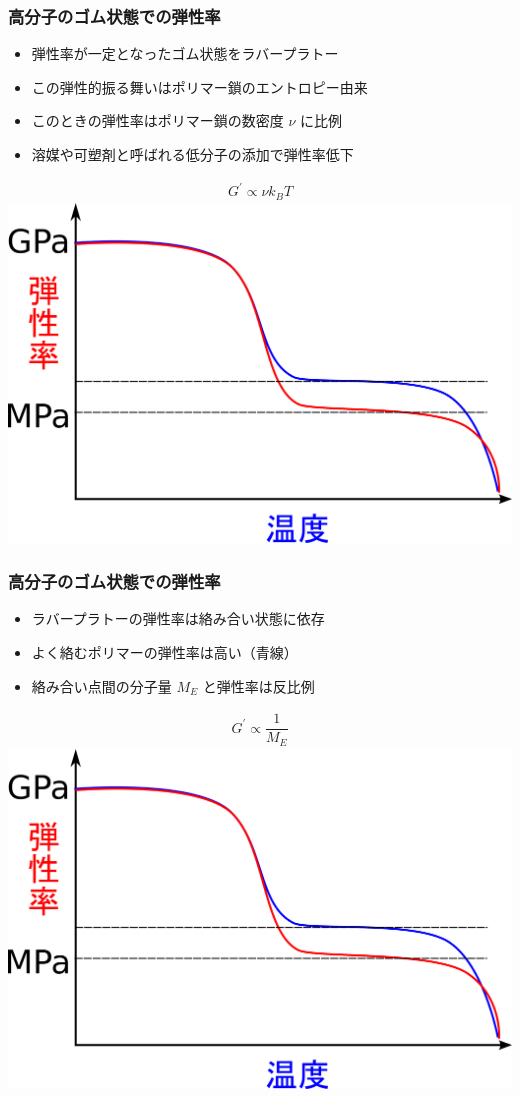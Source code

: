 \documentclass[12pt, dvipdfmx]{beamer}
\begin{document}
\begin{frame}
	\frametitle{高分子のゴム状態での弾性率}
				\begin{itemize}
					\item 弾性率が一定となったゴム状態をラバープラトー
					\item この弾性的振る舞いはポリマー鎖のエントロピー由来
					\item このときの弾性率は\alert{ポリマー鎖の数密度 $\nu$ に比例}
					\item 溶媒や可塑剤と呼ばれる\alert{低分子の添加で弾性率低下}
				\end{itemize}
				\vspace{-.5\baselineskip}
					\begin{align*}
						G^{\prime} \propto \nu k_B T
					\end{align*}
				\centering
						\includegraphics[width=.5\textwidth]{polymer_spectrum_rubber.png}
\end{frame}

\begin{frame}
	\frametitle{高分子のゴム状態での弾性率}
				\begin{itemize}
					\item ラバープラトーの弾性率は絡み合い状態に依存
					\item よく絡むポリマーの弾性率は高い（青線）
					\item 絡み合い点間の分子量 \alert{$M_E$ と弾性率は反比例}
				\end{itemize}
				\vspace{-.5\baselineskip}
					\begin{align*}
						G^{\prime} \propto \dfrac{1}{M_E}
					\end{align*}
				\centering
						\includegraphics[width=.5\textwidth]{polymer_spectrum_rubber.png}
\end{frame}
\end{document}
